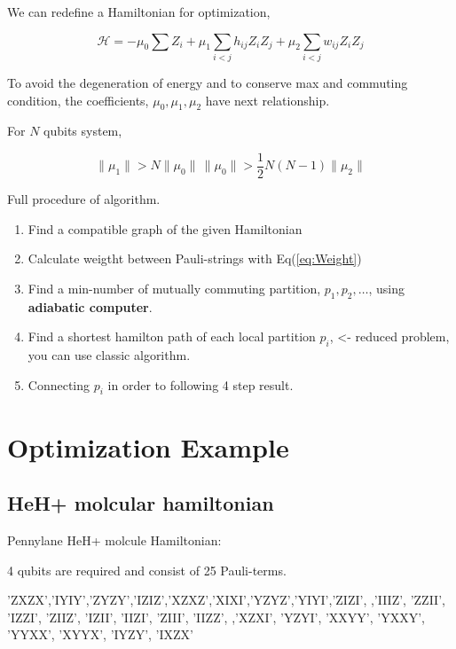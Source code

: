 \documentclass[
11pt,notheorems,hyperref={pdfauthor=Hyunseong Kim}
]{beamer}
\begin{document}
\begin{frame}
    We can redefine a Hamiltonian for optimization,

    \begin{equation}
        \label{eq:whamiltonian}
        \mathcal{H} = - \mu_0 \sum Z_i + \mu_1 \sum_{i <j} h_{ij} Z_i Z_j + \mu_2 \sum_{i<j} w_{ij} Z_i Z_j 
    \end{equation}

    To avoid the degeneration of energy and to conserve max and commuting condition, the coefficients, $\mu_0, \mu_1, \mu_2$ have next relationship.
    
    For $N$ qubits system,

    \begin{equation}
        \|\mu_1\| > N \|\mu_0\| \,  \|\mu_0\| > \frac{1}{2} N(N-1) \|\mu_2\|
    \end{equation}

\end{frame}

\begin{frame}
    Full procedure of algorithm.

    \begin{enumerate}
        \item Find a compatible graph of the given Hamiltonian
        \item Calculate weigtht between Pauli-strings with Eq(\ref{eq:Weight})
        \item Find a min-number of mutually commuting partition, $p_1, p_2, \dots$, using \textbf{adiabatic computer}.
        \item Find a shortest hamilton path of each local partition $p_i$, <- reduced problem, you can use classic algorithm.
        \item Connecting $p_i$ in order to following 4 step result.
    \end{enumerate}
\end{frame}

\section{Optimization Example}
\subsection{HeH+ molcular hamiltonian}
\begin{frame}
    Pennylane HeH+ molcule Hamiltonian: 
    
    4 qubits are required and consist of 25 Pauli-terms.


    'ZXZX','IYIY','ZYZY','IZIZ','XZXZ','XIXI','YZYZ','YIYI','ZIZI',
 ,'IIIZ', 'ZZII', 'IZZI', 'ZIIZ', 'IZII', 'IIZI', 'ZIII', 'IIZZ',
 ,'XZXI', 'YZYI', 'XXYY', 'YXXY', 'YYXX', 'XYYX', 'IYZY', 'IXZX'


\end{frame}
\end{document}
